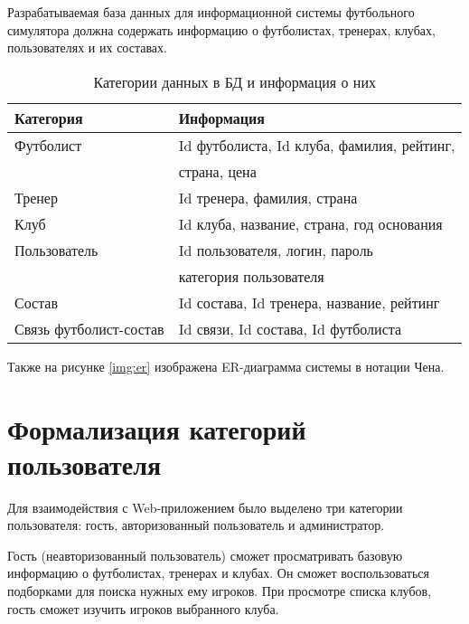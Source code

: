Разрабатываемая база данных для информационной системы футбольного симулятора должна содержать информацию о футболистах, тренерах, клубах, пользователях и их составах. 

\captionsetup{justification=raggedleft,singlelinecheck=off}
\begin{table}[H]
    \centering
	\caption{Категории данных в БД и информация о них}
    \label{tbl:classification_data}
	\begin{tabular}{|l|l|}
        \hline
        \textbf{Категория} & \textbf{Информация} \\ \hline

        Футболист              & Id футболиста, Id клуба, фамилия, рейтинг, \\
                               & страна, цена \\ \hline
        Тренер                 & Id тренера, фамилия, страна \\ \hline
        Клуб                   & Id клуба, название, страна, год основания \\ \hline
        Пользователь           & Id пользователя, логин, пароль \\ 
                               & категория пользователя \\ \hline
        Состав                 & Id состава, Id тренера, название, рейтинг \\ \hline
        Связь футболист-состав & Id связи, Id состава, Id футболиста \\ \hline

    \end{tabular}
\end{table}

Также на рисунке \ref{img:er} изображена ER-диаграмма системы в нотации Чена.


\clearpage

\section{Формализация категорий пользователя}

Для взаимодействия с Web-приложением было выделено три категории пользователя: гость, авторизованный пользователь и администратор.

Гость (неавторизованный пользователь) сможет просматривать базовую информацию о футболистах, тренерах и клубах. Он сможет воспользоваться подборками для поиска нужных ему игроков. При просмотре списка клубов, гость сможет изучить игроков выбранного клуба.

